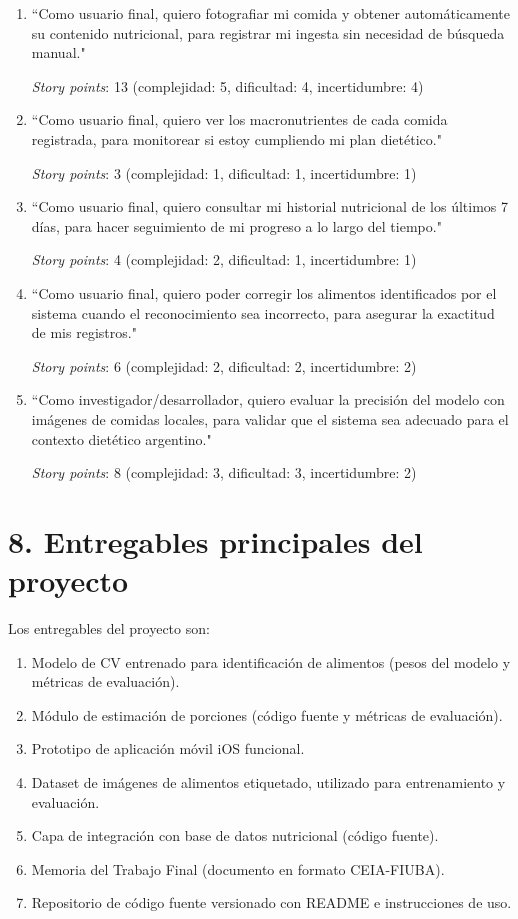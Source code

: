 \documentclass[
11pt, %
]{charter}
\begin{document}
\begin{enumerate}
\item ``Como usuario final, quiero fotografiar mi comida y obtener automáticamente su contenido nutricional, para registrar mi ingesta sin necesidad de búsqueda manual."

\textit{Story points}: 13 (complejidad: 5, dificultad: 4, incertidumbre: 4)

\item ``Como usuario final, quiero ver los macronutrientes de cada comida registrada, para monitorear si estoy cumpliendo mi plan dietético."

\textit{Story points}: 3 (complejidad: 1, dificultad: 1, incertidumbre: 1)

\item ``Como usuario final, quiero consultar mi historial nutricional de los últimos 7 días, para hacer seguimiento de mi progreso a lo largo del tiempo."

\textit{Story points}: 4 (complejidad: 2, dificultad: 1, incertidumbre: 1)

\item ``Como usuario final, quiero poder corregir los alimentos identificados por el sistema cuando el reconocimiento sea incorrecto, para asegurar la exactitud de mis registros."

\textit{Story points}: 6 (complejidad: 2, dificultad: 2, incertidumbre: 2)

\item ``Como investigador/desarrollador, quiero evaluar la precisión del modelo con imágenes de comidas locales, para validar que el sistema sea adecuado para el contexto dietético argentino."

\textit{Story points}: 8 (complejidad: 3, dificultad: 3, incertidumbre: 2)
\end{enumerate}

\section{8. Entregables principales del proyecto}
\label{sec:entregables}

Los entregables del proyecto son:

\begin{enumerate}
	\item Modelo de CV entrenado para identificación de alimentos (pesos del modelo y métricas de evaluación).
	\item Módulo de estimación de porciones (código fuente y métricas de evaluación).
	\item Prototipo de aplicación móvil iOS funcional.
	\item Dataset de imágenes de alimentos etiquetado, utilizado para entrenamiento y evaluación.
	\item Capa de integración con base de datos nutricional (código fuente).
	\item Memoria del Trabajo Final (documento en formato CEIA-FIUBA).
	\item Repositorio de código fuente versionado con README e instrucciones de uso.
\end{enumerate}
\end{document}
